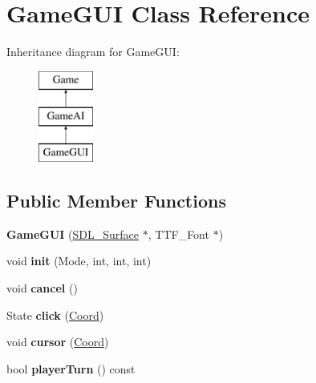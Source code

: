 \hypertarget{classGameGUI}{\section{Game\+G\+U\+I Class Reference}
\label{classGameGUI}
}
Inheritance diagram for Game\+G\+U\+I\+:\begin{figure}[H]
\begin{center}
\leavevmode
\includegraphics[height=3.000000cm]{classGameGUI}
\end{center}
\end{figure}
\subsection*{Public Member Functions}
\begin{DoxyCompactItemize}
\item 
\hypertarget{classGameGUI_a861b8dfdb3581b45689347f1d29dbaa4}{{\bfseries Game\+G\+U\+I} (\hyperlink{structSDL__Surface}{S\+D\+L\+\_\+\+Surface} $\ast$, T\+T\+F\+\_\+\+Font $\ast$)}\label{classGameGUI_a861b8dfdb3581b45689347f1d29dbaa4}

\item 
\hypertarget{classGameGUI_af64590a0f2446d0f423740f2b029ec38}{void {\bfseries init} (Mode, int, int, int)}\label{classGameGUI_af64590a0f2446d0f423740f2b029ec38}

\item 
\hypertarget{classGameGUI_a3b7fac84cc6dea53b4737f04d6c811bc}{void {\bfseries cancel} ()}\label{classGameGUI_a3b7fac84cc6dea53b4737f04d6c811bc}

\item 
\hypertarget{classGameGUI_a871d45a08bc3ccd49c81a4457bc816ca}{State {\bfseries click} (\hyperlink{structCoord}{Coord})}\label{classGameGUI_a871d45a08bc3ccd49c81a4457bc816ca}

\item 
\hypertarget{classGameGUI_aba9fcea825313750c6d20b6997d98acf}{void {\bfseries cursor} (\hyperlink{structCoord}{Coord})}\label{classGameGUI_aba9fcea825313750c6d20b6997d98acf}

\item 
\hypertarget{classGameGUI_aef1f54246657ec24df74b1fb70745e33}{bool {\bfseries player\+Turn} () const }\label{classGameGUI_aef1f54246657ec24df74b1fb70745e33}

\end{DoxyCompactItemize}

